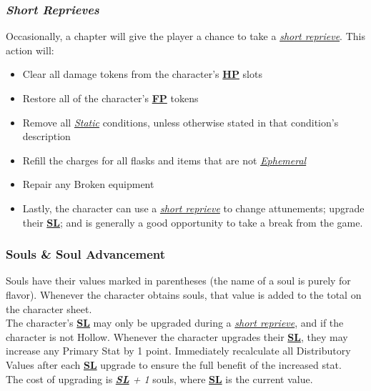\documentclass[12pt]{article}
\newcommand{\refto}[1]{\hyperlink{#1}{\textbf{#1}}}
\newcommand{\reftoit}[1]{\hyperlink{#1}{\emph{#1}}}
\begin{document}
\begin{multicols*}{2}
\subsubsection{\emph{Short Reprieves}}
\hypertarget{short reprieve}{}\hypertarget{short reprieves}{}
Occasionally, a chapter will give the player a chance to take a \reftoit{short reprieve}. This action will:
\begin{itemize}
\item Clear all damage tokens from the character’s \refto{HP} slots
\item Restore all of the character’s \refto{FP} tokens
\item Remove all \reftoit{Static} conditions, unless otherwise stated in that condition’s description
\item Refill the charges for all flasks and items that are not \reftoit{Ephemeral}
\item Repair any Broken equipment
\item Lastly, the character can use a \reftoit{short reprieve} to change attunements; upgrade their \refto{SL}; and is generally a good opportunity to take a break from the game.
\end{itemize}

\subsubsection{Souls \& Soul Advancement}
Souls have their values marked in parentheses (the name of a soul is purely for flavor). Whenever the character obtains souls, that value is added to the total on the character sheet. \\
The character’s \refto{SL} may only be upgraded during a \reftoit{short reprieve}, and if the character is not Hollow. Whenever the character upgrades their \refto{SL}, they may increase any Primary Stat by 1 point. Immediately recalculate all Distributory Values after each \refto{SL} upgrade to ensure the full benefit of the increased stat.\\
The cost of upgrading is \emph{\refto{SL} + 1} souls, where \refto{SL} is the current value.


\end{multicols*}
\end{document}
